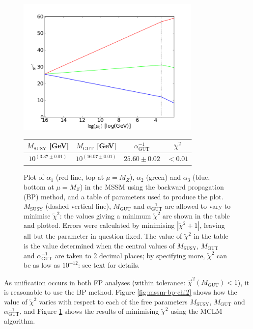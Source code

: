 \documentclass[12pt,a4paper,oneside]{article}
\begin{document}
\begin{figure}[t]
\begin{center}
\includegraphics[width=9cm]{figs/mssm-bp-2loop.png} \\
\vspace{2em}
\begin{tabular}{ccc|c}
$M_\mathrm{SUSY}$ [GeV] & $M_\mathrm{GUT}$ [GeV] & $\alpha_\mathrm{GUT}^{-1}$ & $\overleftarrow{\chi}^2$ \\
\hline
$10^{(3.37\pm0.01)}$  & $10^{(16.07\pm0.01)}$ & $25.60\pm0.02$ & $< 0.01$
\end{tabular}

\caption[]{Plot of $\alpha_1$ (red line, top at $\mu = M_Z$), $\alpha_2$ (green) and $\alpha_3$ (blue, bottom at $\mu = M_Z$) in the MSSM using the backward propagation (BP) method, and a table of parameters used to produce the plot. $M_\mathrm{SUSY}$ (dashed vertical line), $M_\mathrm{GUT}$ and $\alpha_\mathrm{GUT}^{-1}$ are allowed to vary to minimise $\overleftarrow{\chi}^2$: the values giving a minimum $\overleftarrow{\chi}^2$ are shown in the table and plotted. Errors were calculated by minimising $| \overleftarrow{\chi}^2 + 1 |$, leaving all but the parameter in question fixed. The value of $\overleftarrow{\chi}^2$ in the table is the value determined when the central values of $M_\mathrm{SUSY}$, $M_\mathrm{GUT}$ and $\alpha_\mathrm{GUT}^{-1}$ are taken to 2 decimal places; by specifying more, $\overleftarrow{\chi}^2$ can be as low as $10^{-12}$: see text for details.}
\label{fig:mssm-bp}
\end{center}
\end{figure}

As unification occurs in both FP analyses (within tolerance: $\overrightarrow{\chi}^2 (M_\mathrm{GUT}) < 1$), it is reasonable to use the BP method. Figure \ref{fig:mssm-bp-chi2} shows how the value of $\overleftarrow{\chi}^2$ varies with respect to each of the free parameters $M_\mathrm{SUSY}$, $M_\mathrm{GUT}$ and $\alpha_\mathrm{GUT}^{-1}$, and Figure \ref{fig:mssm-bp} shows the results of minimising $\overleftarrow{\chi}^2$ using the MCLM algorithm.
\end{document}
